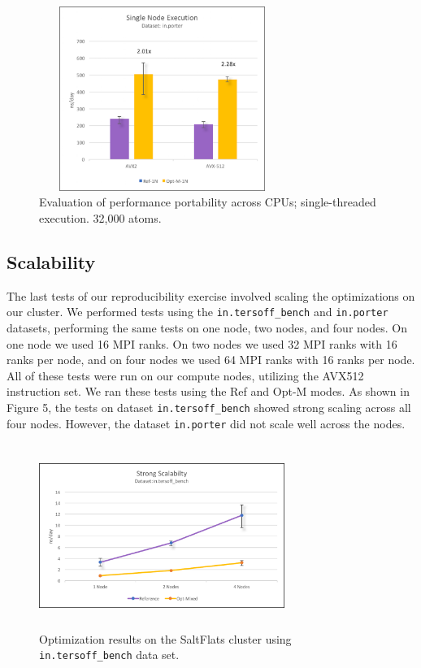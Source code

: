 \documentclass{sig-alternate-05-2015}
\begin{document}
\begin{figure}
\centering
\includegraphics[height=6cm, width=8cm]{SingleNodePorter.png}
\caption{Evaluation of performance portability across CPUs; single-threaded execution.  32,000 atoms.}
\vskip -6pt
\end{figure}


\subsection{Scalability}
The last tests of our reproducibility exercise involved scaling the optimizations on our cluster.  We performed tests using the 
\texttt{in.tersoff\_bench} and \texttt{in.porter} datasets, performing the same tests on one node, two nodes, and four nodes.  On one node we used 16 MPI ranks.  On two nodes we used 32 MPI ranks with 16 ranks per node, and on four nodes we used 64 MPI ranks with 16 ranks per node.  All of these tests were run on our compute nodes, utilizing the AVX512 instruction set.  We ran these tests using the Ref and Opt-M modes.  As shown in Figure 5, the tests on dataset \texttt{in.tersoff\_bench} showed strong scaling across all four nodes.  However, the dataset \texttt{in.porter} did not scale well across the nodes. 


\begin{figure}
\centering
\includegraphics[height=6cm, width=8cm]{ScalingBench.png}
\caption{Optimization results on the SaltFlats cluster using \texttt{in.tersoff\_bench} data set.}
\vskip -6pt
\end{figure}
\end{document}

